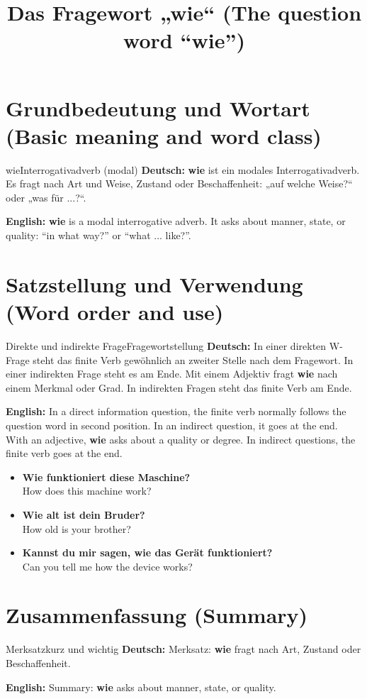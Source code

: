 \documentclass[a4paper,11pt]{article}
\title{Das Fragewort „wie“ (The question word “wie”)}
\date{}
\newcommand{\GermanText}[1]{\textbf{Deutsch: }#1\par}
\newcommand{\EnglishText}[1]{{\small\color{SoftGray}\textbf{English: }#1\par}}
\newcommand{\ExampleItem}[2]{\item \textbf{#1}\\{\small\color{SoftGray}#2}}
\begin{document}
\maketitle
\tableofcontents
\newpage
\section{Grundbedeutung und Wortart (Basic meaning and word class)}
\begin{grammarentry}{wie}{Interrogativadverb (modal)}
\GermanText{\textbf{wie} ist ein modales Interrogativadverb. Es fragt nach Art und Weise, Zustand oder Beschaffenheit: „auf welche Weise?“ oder „was für ...?“.}
\EnglishText{\textbf{wie} is a modal interrogative adverb. It asks about manner, state, or quality: “in what way?” or “what ... like?”.}

\end{grammarentry}
\section{Satzstellung und Verwendung (Word order and use)}
\begin{grammarentry}{Direkte und indirekte Frage}{Fragewortstellung}
\GermanText{In einer direkten W-Frage steht das finite Verb gewöhnlich an zweiter Stelle nach dem Fragewort. In einer indirekten Frage steht es am Ende. Mit einem Adjektiv fragt \textbf{wie} nach einem Merkmal oder Grad. In indirekten Fragen steht das finite Verb am Ende.}
\EnglishText{In a direct information question, the finite verb normally follows the question word in second position. In an indirect question, it goes at the end. With an adjective, \textbf{wie} asks about a quality or degree. In indirect questions, the finite verb goes at the end.}
\end{grammarentry}
\begin{exbox}\begin{itemize}
\ExampleItem{Wie funktioniert diese Maschine?}{How does this machine work?}
\ExampleItem{Wie alt ist dein Bruder?}{How old is your brother?}
\ExampleItem{Kannst du mir sagen, wie das Gerät funktioniert?}{Can you tell me how the device works?}
\end{itemize}\end{exbox}
\section{Zusammenfassung (Summary)}
\begin{grammarentry}{Merksatz}{kurz und wichtig}
\GermanText{Merksatz: \textbf{wie} fragt nach Art, Zustand oder Beschaffenheit.}
\EnglishText{Summary: \textbf{wie} asks about manner, state, or quality.}
\end{grammarentry}
\end{document}
